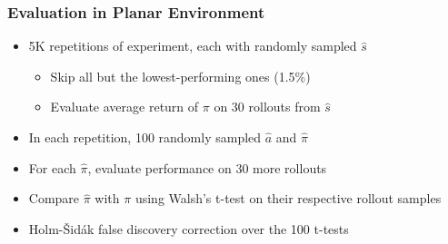 \documentclass[handout]{beamer}
\begin{document}
\begin{frame}
    \frametitle{Evaluation in Planar Environment}


    \begin{itemize}
    \item 5K repetitions of experiment, each with randomly sampled $\hat{s}$
        \begin{itemize}
        \item Skip all but the lowest-performing ones (1.5\%)
        \item Evaluate average return of $\pi$ on 30 rollouts from $\hat{s}$
        \end{itemize}
    \item In each repetition, 100 randomly sampled $\hat{a}$ and $\hat{\pi}$
    \item For each $\hat{\pi}$, evaluate performance on 30 more rollouts
    \item Compare $\hat{\pi}$ with $\pi$ using Walsh's t-test on their respective rollout samples
    \item Holm-Šidák false discovery correction over the 100 t-tests
    \end{itemize}

\end{frame}
\end{document}
